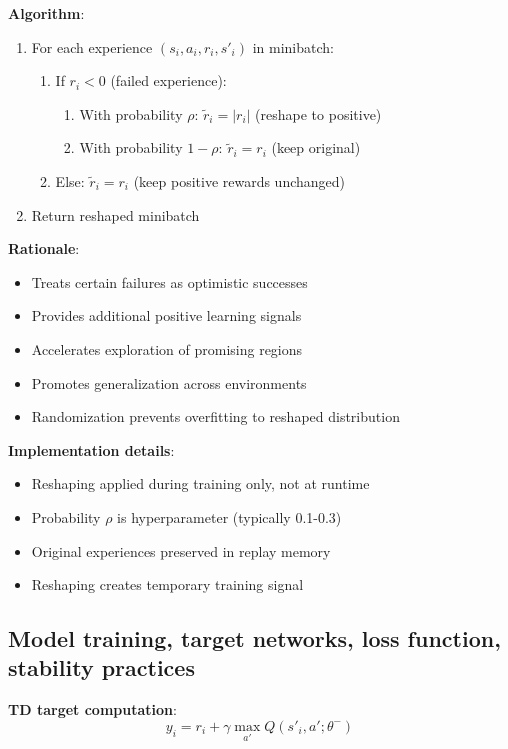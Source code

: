 \documentclass[11pt,a4paper]{article}
\begin{document}
\textbf{Algorithm}:
\begin{enumerate}
    \item For each experience $(s_i, a_i, r_i, s'_i)$ in minibatch:
    \begin{enumerate}
        \item If $r_i < 0$ (failed experience):
        \begin{enumerate}
            \item With probability $\rho$: $\tilde{r}_i = |r_i|$ (reshape to positive)
            \item With probability $1-\rho$: $\tilde{r}_i = r_i$ (keep original)
        \end{enumerate}
        \item Else: $\tilde{r}_i = r_i$ (keep positive rewards unchanged)
    \end{enumerate}
    \item Return reshaped minibatch
\end{enumerate}

\textbf{Rationale}:
\begin{itemize}
    \item Treats certain failures as optimistic successes
    \item Provides additional positive learning signals
    \item Accelerates exploration of promising regions
    \item Promotes generalization across environments
    \item Randomization prevents overfitting to reshaped distribution
\end{itemize}

\textbf{Implementation details}:
\begin{itemize}
    \item Reshaping applied during training only, not at runtime
    \item Probability $\rho$ is hyperparameter (typically 0.1-0.3)
    \item Original experiences preserved in replay memory
    \item Reshaping creates temporary training signal
\end{itemize}

\subsection{Model training, target networks, loss function, stability practices}

\textbf{TD target computation}:
\begin{equation}
y_i = r_i + \gamma \max_{a'} Q(s'_i, a'; \theta^-)
\end{equation}
\end{document}
